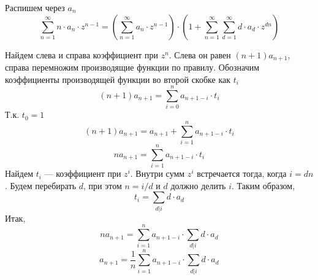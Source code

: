 \documentclass[10pt]{article}
\begin{document}
\begin{enumerate}
Распишем через $a_n$
$$\sum_{n=1}^\infty n \cdot a_n \cdot z^{n-1} = \left ( \sum_{n=1}^\infty a_n \cdot z^{n-1} \right ) \cdot \left (1 + \sum_{n=1}^\infty \sum_{d=1}^\infty d \cdot a_d \cdot z^{dn} \right)$$

Найдем слева и справа коэффициент при $z^n$. Слева он равен $(n+1) a_{n+1}$, справа перемножим производящие функции по правилу. Обозначим коэффициенты производящей функции во второй скобке как $t_i$
$$(n+1) a_{n+1} = \sum_{i=0}^n a_{n+1-i} \cdot t_i$$
Т.к. $t_0 = 1$
$$(n+1) a_{n+1} = a_{n+1} + \sum_{i=1}^n a_{n+1-i} \cdot t_i$$
$$n a_{n+1} = \sum_{i=1}^n a_{n+1-i} \cdot t_i$$
Найдем $t_i$ --- коэффициент при $z^i$. Внутри сумм $z^i$ встречается тогда, когда $i = dn$. Будем перебирать $d$, при этом $n = i/d$ и $d$ должно делить $i$. Таким образом,
$$t_i = \sum_{d|i} d \cdot a_d$$
Итак,
$$n a_{n+1} = \sum_{i=1}^n a_{n+1-i} \cdot \sum_{d|i} d \cdot a_d$$
$$a_{n+1} = \frac{1}{n} \sum_{i=1}^n a_{n+1-i} \cdot \sum_{d|i} d \cdot a_d$$
\end{enumerate}
\end{document}
